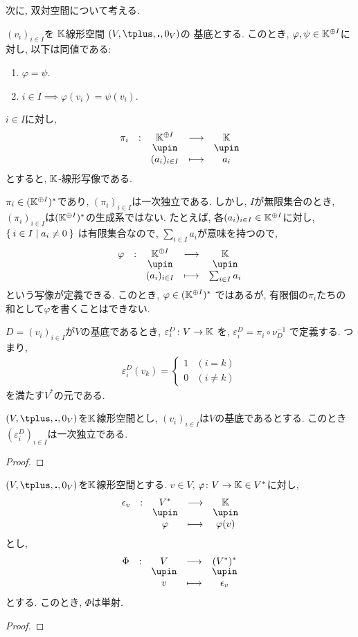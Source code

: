 次に, 双対空間について考える.
\begin{prop}
$(v_i)_{i\in I}$を
$\mathbb{K}$線形空間
$(V,\plus,\act,0_V)$の
基底とする.
このとき,
$\varphi,\psi\in \mathbb{K}^{\oplus I}$に対し,
以下は同値である:
\begin{enumerate}
\item $\varphi=\psi$.
\item $i\in I\implies \varphi(v_i)=\psi(v_i)$.
\end{enumerate}
\end{prop}

$i\in I$に対し,
\begin{align*}
\shazo{\pi_{i}}{\KK^{\oplus I}}{\KK}
{(a_i)_{i\in I}}{a_i}
\end{align*}
とすると, $\mathbb{K}$-線形写像である.

\begin{remark}
$\pi_i\in (\mathbb{K}^{\oplus I})^\ast$であり,
$(\pi_i)_{i\in I}$は一次独立である.
しかし,
$I$が無限集合のとき, 
$(\pi_i)_{i\in I}$は$(\mathbb{K}^{\oplus I})^\ast$の生成系ではない.
たとえば,
各$(a_i)_{i\in I}\in \mathbb{K}^{\oplus I}$に対し,
$\Set{i\in I| a_i\neq 0}$
は有限集合なので,
$\sum_{i\in I}a_i$が意味を持つので,
\begin{align*}
\shazo{\varphi}{\KK^{\oplus I}}{\KK}
{(a_i)_{i\in I}}{\sum_{i\in I}a_i}
\end{align*}
という写像が定義できる.
このとき,
$\varphi\in (\mathbb{K}^{\oplus I})^\ast$
ではあるが,
有限個の$\pi_i$たちの和として$\varphi$を書くことはできない.
\end{remark}

$D=(v_i)_{i\in I}$が$V$の基底であるとき,
$\varepsilon^D_{i}\colon V\to \mathbb{K}$
を,
$\varepsilon^D_{i}=\pi_i\circ \nu_{D}^{-1}$
で定義する.
つまり,
\begin{align*}
\varepsilon^D_{i}(v_k)=
\begin{cases}
1&(i=k)\\
0&(i\neq k)
\end{cases}
\end{align*}
を満たす$V^\ast$の元である.
\begin{prop}
  $(V,\plus,\act,0_V)$を$\mathbb{K}$線形空間とし,
  $(v_i)_{i\in I}$は$V$の基底であるとする.
  このとき
  $(\varepsilon^{D}_{i})_{i\in I}$は一次独立である.
\end{prop}
\begin{proof}\end{proof}


\begin{prop}
$(V,\plus,\act,0_V)$を$\mathbb{K}$線形空間とする.
$v\in V$,
$\varphi\colon V\to\mathbb{K}\in V^\ast$に対し,
\begin{align*}
\shazo{\epsilon_v}{V^\ast}{\KK}
{\varphi}{\varphi(v)}
\end{align*}
とし,
\begin{align*}
\shazo{\Phi}{V}{(V^\ast)^\ast}
{v}{\epsilon_v}
\end{align*}
とする.
このとき, $\Phi$は単射.
\end{prop}
\begin{proof}\end{proof}

